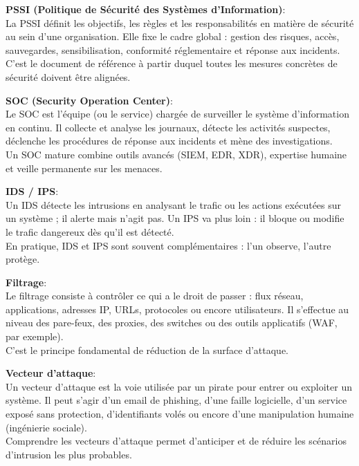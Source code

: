 \medskip

\noindent \textbf{PSSI (Politique de Sécurité des Systèmes d’Information)}:\\
La PSSI définit les objectifs, les règles et les responsabilités en matière de sécurité au sein d’une organisation. Elle fixe le cadre global : gestion des risques, accès, sauvegardes, sensibilisation, conformité réglementaire et réponse aux incidents.\\
C’est le document de référence à partir duquel toutes les mesures concrètes de sécurité doivent être alignées.

\newpage

\noindent \textbf{SOC (Security Operation Center)}:\\
Le SOC est l’équipe (ou le service) chargée de surveiller le système d’information en continu. Il collecte et analyse les journaux, détecte les activités suspectes, déclenche les procédures de réponse aux incidents et mène des investigations.\\
Un SOC mature combine outils avancés (SIEM, EDR, XDR), expertise humaine et veille permanente sur les menaces.

\medskip

\noindent \textbf{IDS / IPS}:\\
Un IDS détecte les intrusions en analysant le trafic ou les actions exécutées sur un système ; il alerte mais n’agit pas. Un IPS va plus loin : il bloque ou modifie le trafic dangereux dès qu’il est détecté.\\
En pratique, IDS et IPS sont souvent complémentaires : l’un observe, l’autre protège.

\medskip

\noindent \textbf{Filtrage}:\\
Le filtrage consiste à contrôler ce qui a le droit de passer : flux réseau, applications, adresses IP, URLs, protocoles ou encore utilisateurs. Il s’effectue au niveau des pare-feux, des proxies, des switches ou des outils applicatifs (WAF, par exemple).\\
C’est le principe fondamental de réduction de la surface d’attaque.

\medskip

\noindent \textbf{Vecteur d’attaque}:\\
Un vecteur d’attaque est la voie utilisée par un pirate pour entrer ou exploiter un système. Il peut s’agir d’un email de phishing, d’une faille logicielle, d’un service exposé sans protection, d’identifiants volés ou encore d’une manipulation humaine (ingénierie sociale).\\
Comprendre les vecteurs d’attaque permet d’anticiper et de réduire les scénarios d’intrusion les plus probables.

